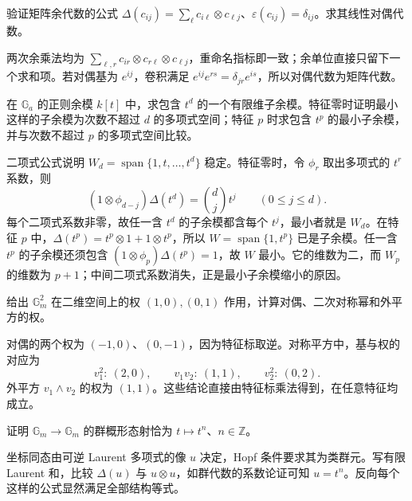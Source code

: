 \begin{optionalexercise}\label{b5:ex:21:07}
	验证矩阵余代数的公式 \(\Delta(c_{ij})=\sum_\ell c_{i\ell}\otimes c_{\ell j}\)、\(\varepsilon(c_{ij})=\delta_{ij}\)。求其线性对偶代数。
\end{optionalexercise}
\begin{solution}
	两次余乘法均为 \(\sum_{\ell,r}c_{ir}\otimes c_{r\ell}\otimes c_{\ell j}\)，重命名指标即一致；余单位直接只留下一个求和项。若对偶基为 \(e^{ij}\)，卷积满足 \(e^{ij}e^{rs}=\delta_{jr}e^{is}\)，所以对偶代数为矩阵代数。
\end{solution}

\begin{optionalexercise}\label{b5:ex:21:08}
	在 \(\mathbb G_a\) 的正则余模 \(k[t]\) 中，求包含 \(t^d\) 的一个有限维子余模。特征零时证明最小这样的子余模为次数不超过 \(d\) 的多项式空间；特征 \(p\) 时求包含 \(t^p\) 的最小子余模，并与次数不超过 \(p\) 的多项式空间比较。
\end{optionalexercise}
\begin{solution}
	二项式公式说明 \(W_d=\operatorname{span}\{1,t,\ldots,t^d\}\) 稳定。特征零时，令 \(\phi_r\) 取出多项式的 \(t^r\) 系数，则
	\[
		(1\otimes\phi_{d-j})\Delta(t^d)=\binom dj t^j\qquad(0\le j\le d).
	\]
	每个二项式系数非零，故任一含 \(t^d\) 的子余模都含每个 \(t^j\)，最小者就是 \(W_d\)。在特征 \(p\) 中，\(\Delta(t^p)=t^p\otimes1+1\otimes t^p\)，所以 \(W=\operatorname{span}\{1,t^p\}\) 已是子余模。任一含 \(t^p\) 的子余模还须包含 \((1\otimes\phi_p)\Delta(t^p)=1\)，故 \(W\) 最小。它的维数为二，而 \(W_p\) 的维数为 \(p+1\)；中间二项式系数消失，正是最小子余模缩小的原因。
\end{solution}

\begin{optionalexercise}\label{b5:ex:21:09}
	给出 \(\mathbb G_m^2\) 在二维空间上的权 \((1,0),(0,1)\) 作用，计算对偶、二次对称幂和外平方的权。
\end{optionalexercise}
\begin{solution}
	对偶的两个权为 \((-1,0)\)、\((0,-1)\)，因为特征标取逆。对称平方中，基与权的对应为
	\[
		v_1^2:\ (2,0),\qquad v_1v_2:\ (1,1),\qquad v_2^2:\ (0,2).
	\]
	外平方 \(v_1\wedge v_2\) 的权为 \((1,1)\)。这些结论直接由特征标乘法得到，在任意特征均成立。
\end{solution}

\begin{optionalexercise}\label{b5:ex:21:10}
	证明 \(\mathbb G_m\to\mathbb G_m\) 的群概形态射恰为 \(t\mapsto t^n\)、\(n\in\mathbb Z\)。
\end{optionalexercise}
\begin{solution}
	坐标同态由可逆 Laurent 多项式的像 \(u\) 决定，Hopf 条件要求其为类群元。写有限 Laurent 和，比较 \(\Delta(u)\) 与 \(u\otimes u\)，如群代数的系数论证可知 \(u=t^n\)。反向每个这样的公式显然满足全部结构等式。
\end{solution}

